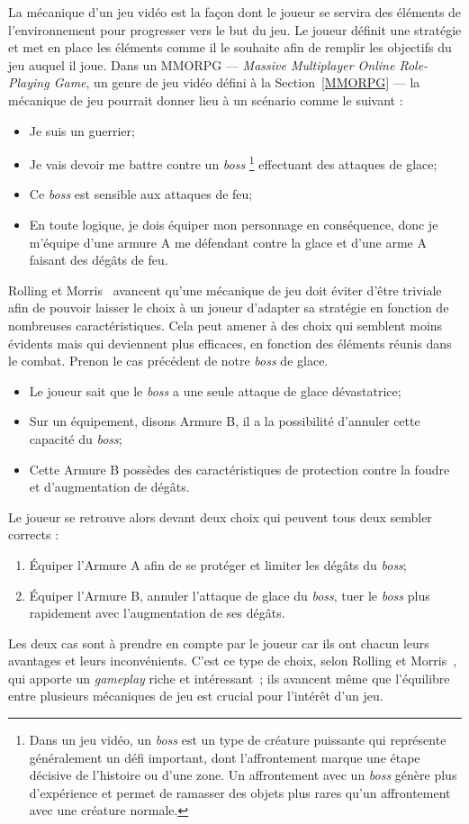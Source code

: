 La mécanique d'un jeu vidéo est la façon dont le joueur se servira des éléments de l'environnement pour progresser vers le but du jeu.
Le joueur définit une stratégie et met en place les éléments comme il le souhaite afin de remplir les objectifs du jeu auquel il joue.
Dans un MMORPG --- \emph{Massive Multiplayer Online Role-Playing Game}, un genre de jeu vidéo défini \`a la Section~\ref{MMORPG} --- la mécanique de jeu pourrait donner lieu \`a un sc\'enario comme le suivant :
\begin{itemize}
    \item Je suis un guerrier;
    \item Je vais devoir me battre contre un \emph{boss}
\footnote{Dans un jeu vid\'eo, un \emph{boss} est un type de créature puissante qui représente généralement un défi important, dont l'affrontement marque une étape décisive de l'histoire ou d'une zone. Un affrontement avec un \emph{boss} génère plus d'expérience et permet de ramasser des objets plus rares qu'un affrontement avec une créature normale.}
% 
      effectuant des attaques de glace;
    \item Ce \emph{boss} est sensible aux attaques de feu;
    \item En toute logique, je dois équiper mon personnage en conséquence, donc 
     je m'équipe d'une armure A me défendant contre la glace et d'une arme A faisant des dégâts de feu.
\end{itemize}
Rolling et Morris~\cite{Rollings2004} avancent qu'une mécanique de jeu doit éviter d'être triviale afin de pouvoir laisser le choix à un joueur d'adapter sa stratégie en fonction de nombreuses caractéristiques.
Cela peut amener à des choix qui semblent moins évidents mais qui deviennent plus efficaces, en fonction des éléments réunis dans le combat.
Prenon le cas précédent de notre \emph{boss} de glace.
\begin{itemize}
    \item Le joueur sait que le \emph{boss} a une seule attaque de glace dévastatrice;
    \item Sur un équipement, disons Armure B, il a la possibilité d'annuler cette capacité du \emph{boss};
    \item Cette Armure B possèdes des caract\'eristiques de protection contre la foudre et d'augmentation de dégâts.
\end{itemize}
Le joueur se retrouve alors devant deux choix qui peuvent tous deux sembler corrects :
\begin{enumerate}
    \item Équiper l'Armure A afin de se protéger et limiter les dégâts du \emph{boss};
    \item Équiper l'Armure B, annuler l'attaque de glace du \emph{boss}, tuer le \emph{boss} plus rapidement avec l'augmentation de ses dégâts. 
\end{enumerate}
Les deux cas sont à prendre en compte par le joueur car ils ont chacun leurs avantages et leurs inconvénients.
C'est ce type de choix, selon Rolling et Morris~\cite{Rollings2004}, qui apporte un \emph{gameplay} riche et intéressant~;  
ils avancent même que l'équilibre entre plusieurs mécaniques de jeu est crucial pour l'int\'er\^et d'un jeu.

